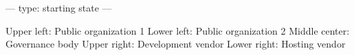 ---
type: starting state
---

Upper left: Public organization 1
Lower left: Public organization 2
Middle center: Governance body
Upper right: Development vendor
Lower right: Hosting vendor
